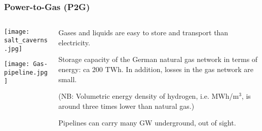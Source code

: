 \documentclass[10pt,dvipsnames]{beamer}
\begin{document}
\begin{frame}
  \frametitle{Power-to-Gas (P2G)}

  \begin{columns}[T]
    \begin{column}{4.5cm}
      \texttt{[image: salt\_caverns.jpg]}

      \vspace{.4cm}

      \texttt{[image: Gas-pipeline.jpg]}
    \end{column}

    \begin{column}{5cm}
      Gases and liquids are easy to \alert{store} and \alert{transport} than electricity.

      Storage capacity of the German natural gas network in terms of energy: ca 200 TWh. In addition, losses in the gas network are small.

   (NB: Volumetric energy density of hydrogen, i.e. MWh/m$^3$, is around three times lower than natural gas.)

      Pipelines can carry many GW underground, out of sight.
    \end{column}

\end{columns}

\end{frame}
\end{document}
